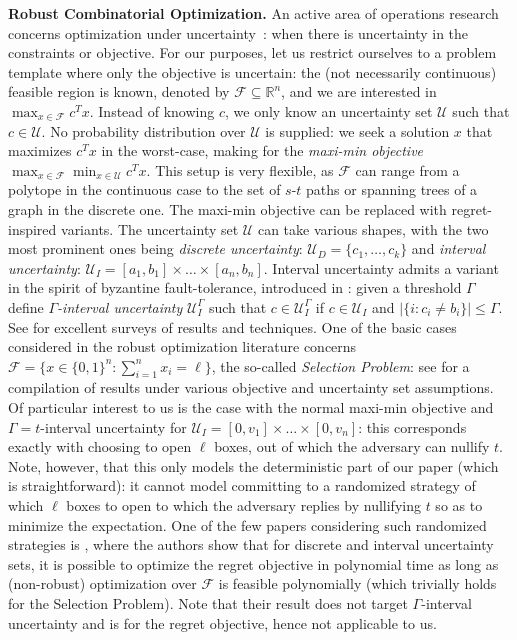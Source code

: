 \documentclass[sigconf,nonacm]{aamas}
\begin{document}
\noindent \textbf{Robust Combinatorial Optimization.} An active area of operations research concerns optimization under uncertainty~\cite{bertsimas2022robust}: when there is uncertainty in the constraints or objective. 
For our purposes, let us restrict ourselves to a problem template where only the objective is uncertain: the (not necessarily continuous) feasible region is known, denoted by $\mathcal{F} \subseteq \mathbb{R}^n$, and we are interested in $\max_{x \in \mathcal{F}} c^T x$. Instead of knowing $c$, we only know an uncertainty set $\mathcal{U}$ such that $c \in \mathcal{U}$. No probability distribution over $\mathcal{U}$ is supplied: we seek a solution $x$ that maximizes $c^T x$ in the worst-case, making for the \emph{maxi-min objective} $\max_{x \in \mathcal{F}} \min_{x \in \mathcal{U}} c^T x$. This setup is very flexible, as $\mathcal{F}$ can range from a polytope in the continuous case to the set of $s$-$t$ paths or spanning trees of a graph in the discrete one. The maxi-min objective can be replaced with regret-inspired variants. The uncertainty set $\mathcal{U}$ can take various shapes, with the two most prominent ones being \emph{discrete uncertainty}: $\mathcal{U}_D = \{c_1, \dots, c_k\}$ and \emph{interval uncertainty}: $\mathcal{U}_I = [a_1, b_1] \times \dots \times [a_n, b_n]$. Interval uncertainty admits a variant in the spirit of byzantine fault-tolerance, introduced in \cite{threshold_adversary_is_defined}: given a threshold $\Gamma$ define \emph{$\Gamma$-interval uncertainty} $\mathcal{U}_I^\Gamma$ such that $c \in \mathcal{U}_I^\Gamma$ if $c \in \mathcal{U}_I$ and $|\{i : c_i \neq b_i\}| \leq \Gamma$. See \cite{robust_survey1, robust_survey2, robust_survey3_algorithmic_design, robust_survey4, robust_survey5_practical} for excellent surveys of results and techniques. One of the basic cases considered in the robust optimization literature concerns $\mathcal{F} = \{x \in \{0, 1\}^n : \sum_{i = 1}^n x_i = \ell\}$, the so-called \emph{Selection Problem}: see \cite{robust_survey2} for a compilation of results under various objective and uncertainty set assumptions. Of particular interest to us is the case with the normal maxi-min objective and $\Gamma=t$-interval uncertainty for $\mathcal{U}_I = [0, v_1] \times \dots \times [0, v_n]$: this corresponds exactly with choosing to open $\ell$ boxes, out of which the adversary can nullify $t$. Note, however, that this only models the deterministic part of our paper (which is straightforward): it cannot model committing to a randomized strategy of which $\ell$ boxes to open to which the adversary replies by nullifying $t$ so as to minimize the expectation. One of the few papers considering such randomized strategies is \cite{selection_minmax_regret_randomized}, where the authors show that for discrete and interval uncertainty sets, it is possible to optimize the regret objective in polynomial time as long as (non-robust) optimization over $\mathcal{F}$ is feasible polynomially (which trivially holds for the Selection Problem). Note that their result does not target $\Gamma$-interval uncertainty and is for the regret objective, hence not applicable to us. 
\end{document}
